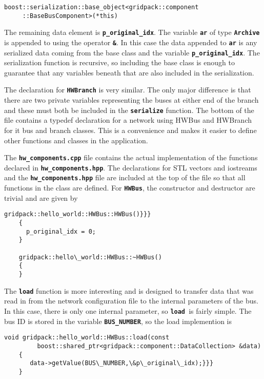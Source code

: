 {
\color{red}
\begin{Verbatim}[fontseries=b]
boost::serialization::base_object<gridpack::component
     ::BaseBusComponent>(*this)
\end{Verbatim}
}

The remaining data element is \texttt{\textbf{p\_original\_idx}}. The variable \texttt{\textbf{ar}} of type \texttt{\textbf{Archive}} is appended to using the operator \texttt{\textbf{\&}}. In this case the data appended to \texttt{\textbf{ar}} is any serialized data coming from the base class and the variable \texttt{\textbf{p\_original\_idx}}. The serialization function is recursive, so including the base class is enough to guarantee that any variables beneath that are also included in the serialization.

The declaration for \texttt{\textbf{HWBranch}} is very similar. The only major difference is that there are two private variables representing the buses at either end of the branch and these must both be included in the \texttt{\textbf{serialize}} function.
The bottom of the file contains a typedef declaration for a network using HWBus and HWBranch for it bus and branch classes. This is a convenience and makes it easier to define other functions and classes in the application.

The \texttt{\textbf{hw\_components.cpp}} file contains the actual implementation of the functions declared in \texttt{\textbf{hw\_components.hpp}}. The declarations for STL vectors and iostreams and the \texttt{\textbf{hw\_components.hpp}} file are included at the top of the file so that all functions in the class are defined. For \texttt{\textbf{HWBus}}, the constructor and destructor are trivial and are given by

{
\color{red}
\begin{Verbatim}[fontseries=b]
    gridpack::hello_world::HWBus::HWBus()}}}
    {
      p_original_idx = 0;
    }

    gridpack::hello\_world::HWBus::~HWBus()
    {
    }
\end{Verbatim}
}

The \texttt{\textbf{load}} function is more interesting and is designed to transfer data that was read in from the network configuration file to the internal parameters of the bus. In this case, there is only one internal parameter, so \texttt{\textbf{load }}is fairly simple. The bus ID is stored in the variable \texttt{\textbf{BUS\_NUMBER}}, so the load implemention is

{
\color{red}
\begin{Verbatim}[fontseries=b]
    void gridpack::hello_world::HWBus::load(const
         boost::shared_ptr<gridpack::component::DataCollection> &data)
    {
       data->getValue(BUS\_NUMBER,\&p\_original\_idx);}}}
    }
\end{Verbatim}
}

